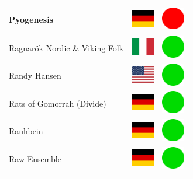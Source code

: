 \documentclass[12pt, a4paper, twoside]{report}
\begin{document}
\begin{center}
\begin{longtable}{|p{5cm}|p{2cm}|p{2cm}|}
 Pyogenesis                                                 & \includegraphics[width=1cm]{../4x3/de} &   \includegraphics[width=1cm]{../likes/n} \\ \hline
 Ragnarök Nordic \& Viking Folk                             & \includegraphics[width=1cm]{../4x3/it} &   \includegraphics[width=1cm]{../likes/y} \\ \hline
 Randy Hansen                                               & \includegraphics[width=1cm]{../4x3/us} &   \includegraphics[width=1cm]{../likes/y} \\ \hline
 Rats of Gomorrah (Divide)                                  & \includegraphics[width=1cm]{../4x3/de} &   \includegraphics[width=1cm]{../likes/y} \\ \hline
 Rauhbein                                                   & \includegraphics[width=1cm]{../4x3/de} &   \includegraphics[width=1cm]{../likes/y} \\ \hline
 Raw Ensemble                                               & \includegraphics[width=1cm]{../4x3/de} &   \includegraphics[width=1cm]{../likes/y} \\ \hline

\end{longtable}
\end{center}
\end{document}
